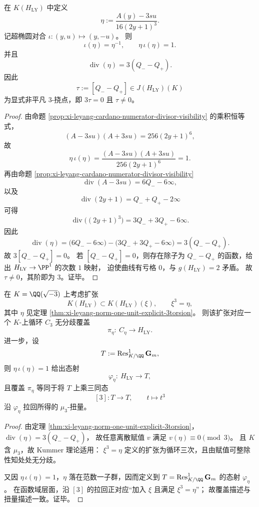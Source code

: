 \begin{theorem}\label{thm:xi-leyang-norm-one-unit-explicit-3torsion}
在 \(K(H_{\mathrm{LY}})\) 中定义
\[
\eta:=\frac{A(y)-3su}{16(2y+1)^3}.
\]
记超椭圆对合 \(\iota:(y,u)\mapsto (y,-u)\)。
则
\[
\iota(\eta)=\eta^{-1},\qquad \eta\,\iota(\eta)=1.
\]
并且
\[
\operatorname{div}(\eta)=3(Q_--Q_+).
\]
因此
\[
\tau:=[Q_--Q_+]\in J(H_{\mathrm{LY}})(K)
\]
为显式非平凡 \(3\)-挠点，即 \(3\tau=0\) 且 \(\tau\neq 0\)。
\end{theorem}
\begin{proof}
由命题 \ref{prop:xi-leyang-cardano-numerator-divisor-visibility} 的乘积恒等式，
\[
(A-3su)(A+3su)=256(2y+1)^6,
\]
故
\[
\eta\,\iota(\eta)=
\frac{(A-3su)(A+3su)}{256(2y+1)^6}=1.
\]
再由命题 \ref{prop:xi-leyang-cardano-numerator-divisor-visibility}
\[
\operatorname{div}(A-3su)=6Q_--6\infty,
\]
以及
\[
\operatorname{div}(2y+1)=Q_-+Q_+-2\infty
\]
可得
\[
\operatorname{div}\!\bigl((2y+1)^3\bigr)=3Q_-+3Q_+-6\infty.
\]
因此
\[
\operatorname{div}(\eta)
=\bigl(6Q_--6\infty\bigr)-\bigl(3Q_-+3Q_+-6\infty\bigr)
=3(Q_--Q_+).
\]
故 \(3[Q_--Q_+]=0\)。
若 \([Q_--Q_+]=0\)，则存在除子为 \(Q_--Q_+\) 的函数，给出 \(H_{\mathrm{LY}}\to\PP^1\) 的次数 \(1\) 映射，
迫使曲线有亏格 \(0\)，与 \(g(H_{\mathrm{LY}})=2\) 矛盾。
故 \(\tau\neq 0\)，其阶即为 \(3\)。证毕。
\end{proof}

\begin{theorem}\label{thm:xi-leyang-kummer-c3-etale-normal-form}
在 \(K=\QQ(\sqrt{-3})\) 上考虑扩张
\[
K(H_{\mathrm{LY}})\subset K(H_{\mathrm{LY}})(\xi),\qquad \xi^3=\eta,
\]
其中 \(\eta\) 见定理 \ref{thm:xi-leyang-norm-one-unit-explicit-3torsion}。
则该扩张对应一个 \(K\)-上循环 \(C_3\) 无分歧覆盖
\[
\pi_\eta:\ C_\eta\longrightarrow H_{\mathrm{LY}}.
\]
进一步，设
\[
T:=\operatorname{Res}^1_{K/\QQ}\mathbf G_m,
\]
则 \(\eta\,\iota(\eta)=1\) 给出态射
\[
\varphi_\eta:\ H_{\mathrm{LY}}\longrightarrow T,
\]
且覆盖 \(\pi_\eta\) 等同于将 \(T\) 上乘三同态
\[
[3]:T\to T,\qquad t\mapsto t^3
\]
沿 \(\varphi_\eta\) 拉回所得的 \(\mu_3\)-扭量。
\end{theorem}
\begin{proof}
由定理 \ref{thm:xi-leyang-norm-one-unit-explicit-3torsion}，
\(
\operatorname{div}(\eta)=3(Q_--Q_+)
\)，
故任意离散赋值 \(v\) 满足 \(v(\eta)\equiv 0\pmod 3\)。
且 \(K\) 含 \(\mu_3\)，故 Kummer 理论适用：
\(
\xi^3=\eta
\)
定义的扩张为循环三次，且由赋值可整除性知处处无分歧。
\par
又因 \(\eta\,\iota(\eta)=1\)，\(\eta\) 落在范数一子群，因而定义到
\(
T=\operatorname{Res}^1_{K/\QQ}\mathbf G_m
\)
的态射 \(\varphi_\eta\)。
在函数域层面，沿 \([3]\) 的拉回正对应“加入 \(\xi\) 且满足 \(\xi^3=\eta\)”；
故覆盖描述与扭量描述一致。证毕。
\end{proof}

